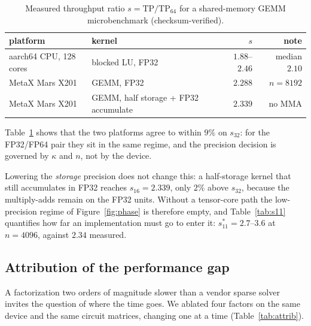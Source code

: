 \begin{table}[t]
  \centering
  \small
  \caption{Measured throughput ratio $s=\mathrm{TP}/\mathrm{TP}_{64}$ for a
  shared-memory GEMM microbenchmark (checksum-verified).}
  \label{tab:platforms}
  \begin{tabular}{llrr}
    \toprule
    platform & kernel & $s$ & note \\
    \midrule
    aarch64 CPU, 128 cores & blocked LU, FP32 & $1.88$--$2.46$ & median $2.10$ \\
    MetaX Mars X201 & GEMM, FP32 & $2.288$ & $n=8192$ \\
    MetaX Mars X201 & GEMM, half storage + FP32 accumulate & $2.339$ & no MMA \\
    \bottomrule
  \end{tabular}
\end{table}

Table~\ref{tab:platforms} shows that the two platforms agree to within $9\%$ on
$s_{32}$: for the FP32/FP64 pair they sit in the same regime, and the precision
decision is governed by $\kappa$ and $n$, not by the device.

Lowering the \emph{storage} precision does not change this: a half-storage kernel
that still accumulates in FP32 reaches $s_{16}=2.339$, only $2\%$ above
$s_{32}$, because the multiply-adds remain on the FP32 units. Without a
tensor-core path the low-precision regime of Figure~\ref{fig:phase} is therefore
empty, and Table~\ref{tab:s11} quantifies how far an implementation must go to
enter it: $s_{11}^*=2.7$--$3.6$ at $n=4096$, against $2.34$ measured.

\subsection{Attribution of the performance gap}\label{sec:attrib}

A factorization two orders of magnitude slower than a vendor sparse solver
invites the question of where the time goes. We ablated four factors on the same
device and the same circuit matrices, changing one at a time
(Table~\ref{tab:attrib}).

